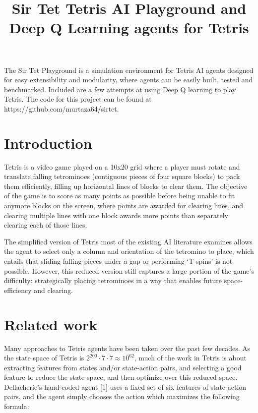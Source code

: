 \documentclass[11pt]{article}
\title{Sir Tet Tetris AI Playground and Deep Q Learning agents for Tetris}
\begin{document}
    
    \maketitle
    


The Sir Tet Playground is a simulation environment for Tetris AI agents
designed for easy extensibility and modularity, where agents can be
easily built, tested and benchmarked. Included are a few attempts at
using Deep Q learning to play Tetris. The code for this project can be
found at https://github.com/murtaza64/sirtet.

\hypertarget{introduction}{%
\section{Introduction}\label{introduction}}

Tetris is a video game played on a 10x20 grid where a player must rotate
and translate falling tetrominoes (contiguous pieces of four square
blocks) to pack them efficiently, filling up horizontal lines of blocks
to clear them. The objective of the game is to score as many points as
possible before being unable to fit anymore blocks on the screen, where
points are awarded for clearing lines, and clearing multiple lines with
one block awards more points than separately clearing each of those
lines.

The simplified version of Tetris most of the existing AI literature
examines allows the agent to select only a column and orientation of the
tetromino to place, which entails that sliding falling pieces under a
gap or performing `T-spins' is not possible. However, this reduced
version still captures a large portion of the game's difficulty:
strategically placing tetrominoes in a way that enables future
space-efficiency and clearing.

\hypertarget{related-work}{%
\section{Related work}\label{related-work}}

Many approaches to Tetris agents have been taken over the past few
decades. As the state space of Tetris is
\(2^{200} \cdot 7\cdot 7 \approx 10^{62}\), much of the work in Tetris
is about extracting features from states and/or state-action pairs, and
selecting a good feature to reduce the state space, and then optimize
over this reduced space. Dellacherie's hand-coded agent {[}1{]} uses a
fixed set of six features of state-action pairs, and the agent simply
chooses the action which maximizes the following formula:
\end{document}

